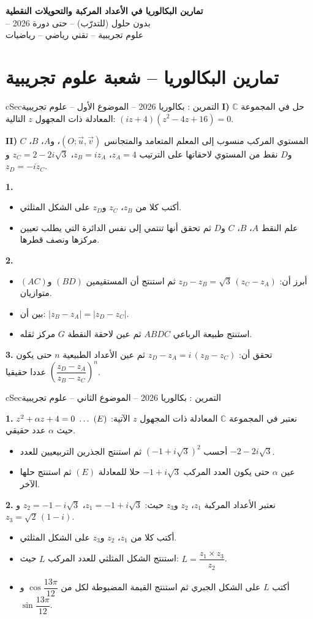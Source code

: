 \documentclass[12pt,a4paper]{article}
\newenvironment{BOX}[2]{\begin{otherlanguage}{english}\begin{arbox}{#1}{#2}}{\end{arbox}\end{otherlanguage}}
\newcounter{exo}
\newenvironment{tamrin}[1]{\stepcounter{exo}\begin{BOX}{cSec}{التمرين \theexo: #1}}{\end{BOX}}
\newenvironment{LTR}{\begin{otherlanguage}{english}}{\end{otherlanguage}}
\renewcommand{\ldots}{\mathinner{\ldotp\ldotp\ldotp}}
\newenvironment{sq}{\begin{itemize}[leftmargin=2.4em,itemsep=3pt]}{\end{itemize}}
\newcommand{\qa}{\item[(أ)]}\newcommand{\qb}{\item[(ب)]}\newcommand{\qc}{\item[(جـ)]}\newcommand{\qd}{\item[(د)]}\newcommand{\qe}{\item[(هـ)]}
\newcommand{\QQ}[1]{\par\smallskip\textbf{#1.} }
\begin{document}
\begin{LTR}
\begin{tcolorbox}[enhanced,colback=cSec,colframe=cSec,arc=3mm,halign=center,boxrule=0pt,top=12pt,bottom=12pt,before upper={\selectlanguage{arabic}}]
{\color{white}\fontsize{24}{30}\selectfont\bfseries تمارين البكالوريا في الأعداد المركبة والتحويلات النقطية}\\[8pt]
{\color{white}\large -- بدون حلول (للتدرّب) -- حتى دورة 2026}\\[5pt]
{\color{white}\large علوم تجريبية -- تقني رياضي -- رياضيات}
\end{tcolorbox}
\end{LTR}
\section{تمارين البكالوريا -- شعبة علوم تجريبية}
\begin{tamrin}{بكالوريا 2026 -- الموضوع الأول -- علوم تجريبية}
\textbf{I)} حل في المجموعة $\mathbb{C}$ المعادلة ذات المجهول $z$ التالية: $(iz+4)(z^2-4z+16)=0$.

\textbf{II)} المستوي المركب منسوب إلى المعلم المتعامد والمتجانس $(O;\vec u,\vec v)$، و$A$، $B$، $C$ و$D$ نقط من المستوي لاحقاتها على الترتيب $z_A=4$، $z_B=iz_A$، $z_C=2-2i\sqrt3$ و$z_D=-iz_C$.
\QQ{1}
\begin{sq}
\qa أكتب كلا من $z_B$، $z_C$ و$z_D$ على الشكل المثلثي.
\qb علم النقط $A$، $B$، $C$ و$D$ ثم تحقق أنها تنتمي إلى نفس الدائرة التي يطلب تعيين مركزها ونصف قطرها.
\end{sq}
\QQ{2}
\begin{sq}
\qa أبرز أن: $z_D-z_B=\sqrt3\,(z_C-z_A)$ ثم استنتج أن المستقيمين $(BD)$ و$(AC)$ متوازيان.
\qb بين أن: $|z_B-z_A|=|z_D-z_C|$.
\qc استنتج طبيعة الرباعي $ABDC$ ثم عين لاحقة النقطة $G$ مركز ثقله.
\end{sq}
\QQ{3} تحقق أن: $z_D-z_A=i\,(z_B-z_C)$ ثم عين الأعداد الطبيعية $n$ حتى يكون $\left(\dfrac{z_D-z_A}{z_B-z_C}\right)^{n}$ عددا حقيقيا.
\end{tamrin}

\begin{tamrin}{بكالوريا 2026 -- الموضوع الثاني -- علوم تجريبية}
\QQ{1} نعتبر في المجموعة $\mathbb{C}$ المعادلة ذات المجهول $z$ الآتية: $z^2+\alpha z+4=0 \ \ldots\ (E)$ حيث $\alpha$ عدد حقيقي.
\begin{sq}
\qa أحسب $\left(-1+i\sqrt3\right)^2$ ثم استنتج الجذرين التربيعيين للعدد $-2-2i\sqrt3$.
\qb عين $\alpha$ حتى يكون العدد المركب $-1+i\sqrt3$ حلا للمعادلة $(E)$ ثم استنتج حلها الآخر.
\end{sq}
\QQ{2} نعتبر الأعداد المركبة $z_1$، $z_2$ و$z_3$ حيث: $z_1=-1+i\sqrt3$، $z_2=-1-i\sqrt3$ و$z_3=\sqrt2\,(1-i)$.
\begin{sq}
\qa أكتب كلا من $z_1$، $z_2$ و$z_3$ على الشكل المثلثي.
\qb استنتج الشكل المثلثي للعدد المركب $L$ حيث: $L=\dfrac{z_1\times z_3}{z_2}$.
\qc أكتب $L$ على الشكل الجبري ثم استنتج القيمة المضبوطة لكل من $\cos\dfrac{13\pi}{12}$ و$\sin\dfrac{13\pi}{12}$.
\end{sq}
\end{tamrin}
\end{document}
